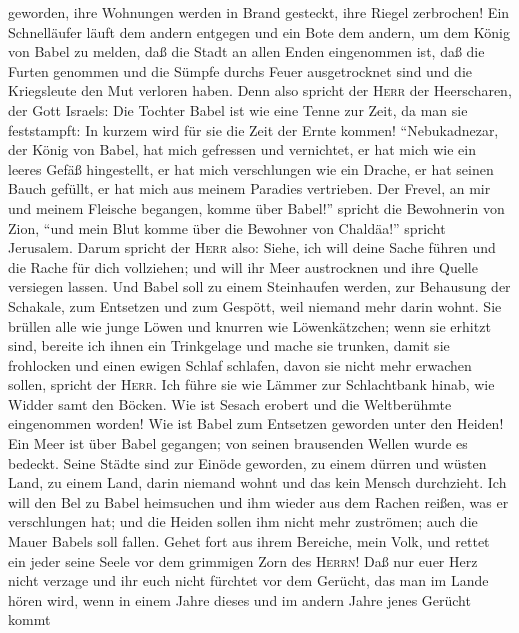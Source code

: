 geworden, ihre Wohnungen werden in Brand gesteckt, ihre Riegel
zerbrochen!  Ein Schnelläufer läuft dem andern entgegen
und ein Bote dem andern, um dem König von Babel zu melden, daß die Stadt
an allen Enden eingenommen ist,  daß die Furten genommen
und die Sümpfe durchs Feuer ausgetrocknet sind und die Kriegsleute den
Mut verloren haben.  Denn also spricht der \textsc{Herr}
der Heerscharen, der Gott Israels: Die Tochter Babel ist wie eine Tenne
zur Zeit, da man sie feststampft: In kurzem wird für sie die Zeit der
Ernte kommen!  ``Nebukadnezar, der König von Babel, hat
mich gefressen und vernichtet, er hat mich wie ein leeres Gefäß
hingestellt, er hat mich verschlungen wie ein Drache, er hat seinen
Bauch gefüllt, er hat mich aus meinem Paradies vertrieben.
 Der Frevel, an mir und meinem Fleische begangen, komme
über Babel!'' spricht die Bewohnerin von Zion, ``und mein Blut komme
über die Bewohner von Chaldäa!'' spricht Jerusalem. 
Darum spricht der \textsc{Herr} also: Siehe, ich will deine Sache führen
und die Rache für dich vollziehen; und will ihr Meer austrocknen und
ihre Quelle versiegen lassen.  Und Babel soll zu einem
Steinhaufen werden, zur Behausung der Schakale, zum Entsetzen und zum
Gespött, weil niemand mehr darin wohnt.  Sie brüllen alle
wie junge Löwen und knurren wie Löwenkätzchen;  wenn sie
erhitzt sind, bereite ich ihnen ein Trinkgelage und mache sie trunken,
damit sie frohlocken und einen ewigen Schlaf schlafen, davon sie nicht
mehr erwachen sollen, spricht der \textsc{Herr}.  Ich
führe sie wie Lämmer zur Schlachtbank hinab, wie Widder samt den Böcken.
 Wie ist Sesach erobert und die Weltberühmte eingenommen
worden! Wie ist Babel zum Entsetzen geworden unter den Heiden!
 Ein Meer ist über Babel gegangen; von seinen brausenden
Wellen wurde es bedeckt.  Seine Städte sind zur Einöde
geworden, zu einem dürren und wüsten Land, zu einem Land, darin niemand
wohnt und das kein Mensch durchzieht.  Ich will den Bel
zu Babel heimsuchen und ihm wieder aus dem Rachen reißen, was er
verschlungen hat; und die Heiden sollen ihm nicht mehr zuströmen; auch
die Mauer Babels soll fallen.  Gehet fort aus ihrem
Bereiche, mein Volk, und rettet ein jeder seine Seele vor dem grimmigen
Zorn des \textsc{Herrn}!  Daß nur euer Herz nicht verzage
und ihr euch nicht fürchtet vor dem Gerücht, das man im Lande hören
wird, wenn in einem Jahre dieses und im andern Jahre jenes Gerücht kommt
